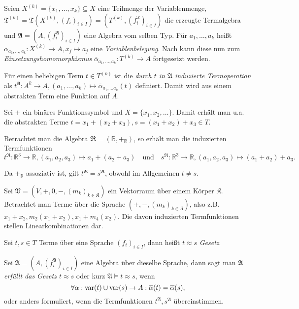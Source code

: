 \vspace*{-\lineskip}

\begin{definition}
    Seien $X^{(k)} = \{x_1, \ldots, x_k\} \subseteq X$ eine Teilmenge der Variablenmenge, $\mathfrak{T}^{(k)} = \mathfrak{T}(X^{(k)}, (f_i)_{i \in I}) = (T^{(k)}, (f_i^\mathfrak{T})_{i \in I})$ die erzeugte Termalgebra und $\mathfrak{A} = (A, (f_i^\mathfrak{A})_{i \in I})$ eine Algebra vom selben Typ. Für $a_1, \ldots, a_k$ heißt $\alpha_{a_1, \ldots, a_k}: X^{(k)} \to A, x_j \mapsto a_j$ eine \emph{Variablenbelegung}. Nach  kann diese nun zum \emph{Einsetzungshomomorphismus} $\overline{\alpha}_{a_1, \ldots, a_k}: T^{(k)} \to A$ fortgesetzt werden.

    Für einen beliebigen Term $t \in T^{(k)}$ ist die \emph{durch $t$ in $\mathfrak{A}$ induzierte Termoperation} als $t^\mathfrak{A}: A^k \to A, (a_1, \ldots, a_k) \mapsto \overline{\alpha}_{a_1, \ldots a_k}(t)$ definiert. Damit wird aus einem abstrakten Term eine Funktion auf $A$.
\end{definition}

\begin{example}
    Sei $+$ ein binäres Funktionssymbol und $X = \{x_1, x_2, \ldots \}$. Damit erhält man u.a. die abstrakten Terme $t = x_1 + (x_2 + x_3), s = (x_1 + x_2) + x_3 \in T$.

    Betrachtet man die Algebra $\mathfrak{R} = (\mathbb{R}, +_\mathbb{R})$, so erhält man die induzierten Termfunktionen $$t^\mathfrak{R}: \mathbb{R}^3 \to \mathbb{R}, (a_1, a_2, a_3) \mapsto a_1 + (a_2 + a_3) \quad \text{und} \quad s^\mathfrak{R}: \mathbb{R}^3 \to \mathbb{R}, (a_1, a_2, a_3) \mapsto (a_1 + a_2) + a_3.$$

    Da $+_\mathbb{R}$ assoziativ ist, gilt $t^\mathfrak{R} = s^\mathfrak{R}$, obwohl im Allgemeinen $t \neq s$.
\end{example}

\begin{example}
    Sei $\mathfrak{V} = (V, +, 0, -, (m_k)_{k \in \mathfrak{K}})$ ein Vektorraum über einem Körper $\mathfrak{K}$. Betrachtet man Terme über die Sprache $(+, -, (m_k)_{k \in \mathfrak{K}})$, also z.B. $x_1 + x_2, m_2(x_1 + x_2), x_1 + m_4(x_2)$. Die davon induzierten Termfunktionen stellen Linearkombinationen dar.
\end{example}

\begin{definition}
    Sei $t, s \in T$ Terme über eine Sprache $(f_i)_{i \in I}$, dann heißt $t \approx s$ \emph{Gesetz}.

    Sei $\mathfrak{A} = (A, (f_i^\mathfrak{A})_{i \in I})$ eine Algebra über dieselbe Sprache, dann sagt man \emph{$\mathfrak{A}$ erfüllt das Gesetz $t \approx s$} oder kurz \emph{$\mathfrak{A} \models t \approx s$}, wenn 
    $$ \forall \alpha: \operatorname{var}(t) \cup \operatorname{var}(s) \to A: \overline{\alpha}(t) = \overline{\alpha}(s), $$
    oder anders formuliert, wenn die Termfunktionen $t^\mathfrak{A}, s^\mathfrak{A}$ übereinstimmen.
\end{definition}